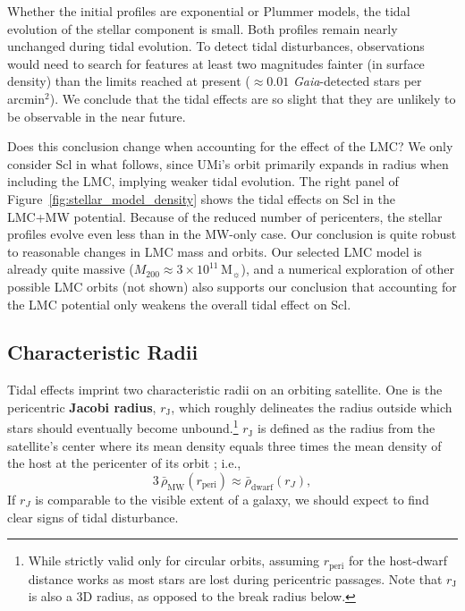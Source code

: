 \documentclass[linenumbers, twocolumn, twocolappendix]{aastex701}
\newcommand{\Mo}{\mathrm{M}_\sun}
\begin{document}
Whether the initial profiles are exponential or Plummer models, the tidal evolution of the stellar component is small. Both profiles remain nearly unchanged during
tidal evolution. To detect tidal disturbances, observations would  need to  search for features at least two magnitudes fainter (in surface density) than the limits reached at present ($\approx 0.01$ \textit{Gaia}-detected stars per arcmin$^2$). We conclude that the tidal effects are so slight that they are unlikely to be observable in the near future.

Does this conclusion change when accounting for the effect of the LMC? We only consider Scl in what follows, since  UMi's orbit primarily expands in radius when including the LMC, implying weaker tidal evolution.
The right panel of Figure~\ref{fig:stellar_model_density} shows the tidal effects on Scl in the LMC+MW potential.
Because of the reduced number of pericenters,
the stellar profiles evolve even less than in the MW-only case. Our conclusion is quite robust to reasonable changes in LMC mass and orbits. Our selected LMC model is already quite massive ($M_{200} \approx 3\times10^{11}\,\Mo$), and a numerical exploration of other possible LMC orbits (not shown) also supports our conclusion that accounting for the LMC potential only weakens the overall tidal effect on Scl.

\subsection{Characteristic Radii} \label{sec:break_radii}

Tidal effects imprint two characteristic radii on an orbiting satellite. One is
the pericentric \textbf{Jacobi radius}, $r_\text{J}$, which roughly delineates  the radius outside which stars should eventually become unbound.\footnote{ 
    While strictly valid only for circular orbits, assuming
$r_\text{peri}$ for the host-dwarf distance works as most stars are
lost during pericentric passages. Note that $r_\text{J}$ is also a 3D radius, as opposed to the break radius below.} $r_\text{J}$ is defined as the radius from the satellite's center where its mean density equals three times the mean density of the host at the pericenter of its orbit \citep[eq. 7-84]{BT1987}; i.e.,
\begin{equation}\label{eq:r_jacobi}
    3\, \bar \rho_\text{MW}(r_\text{peri}) \approx \bar \rho_\text{dwarf}(r_J),
\end{equation}
If $r_J$ is comparable to
the visible extent of a galaxy, we should expect to find clear signs of
tidal disturbance.
\end{document}

